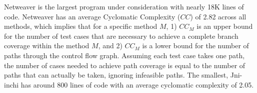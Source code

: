 Netweaver is the largest program under consideration with nearly 18K lines of code.  Netweaver has an average Cyclomatic Complexity ($CC$) of 2.82 across all methods, which implies that for a specific method $M$, 1) $CC_M$ is an upper bound for the number of test cases that are necessary to achieve a complete branch coverage within the method $M$, and 2) $CC_M$ is a lower bound for the number of paths through the control flow graph. Assuming each test case takes one path, the number of cases needed to achieve path coverage is equal to the number of paths that can actually be taken, ignoring infeasible paths.  The smallest, Jni-inchi has around 800 lines of code with an average cyclomatic complexity of 2.05.  

\begin{table}[!t]
\caption{Benchmark Programs and their Properties}
\label{tbl:program_table}
\end{table}

